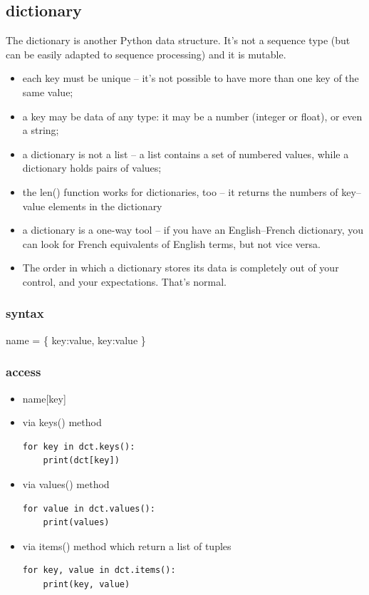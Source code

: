\documentclass[11pt]{article}
\begin{document}
\subsection{dictionary}
\label{sec:orgd43ad41}
The dictionary is another Python data structure. It’s not a sequence
type (but can be easily adapted to sequence processing) and it is
mutable.
\begin{itemize}
\item each key must be unique – it’s not possible to have more than one
key of the same value;
\item a key may be data of any type: it may be a number (integer or
float), or even a string;
\item a dictionary is not a list – a list contains a set of numbered
values, while a dictionary holds pairs of values;
\item the len() function works for dictionaries, too – it returns the
numbers of key–value elements in the dictionary
\item a dictionary is a one-way tool – if you have an English–French
dictionary, you can look for French equivalents of English terms,
but not vice versa.
\item The order in which a dictionary stores its data is completely out of
your control, and your expectations. That’s normal.
\end{itemize}

\subsubsection{syntax}
\label{sec:org21f4638}
name = \{ key:value, key:value \}

\subsubsection{access}
\label{sec:org7cfc2c6}
\begin{itemize}
\item name[key]

\item via keys() method
\begin{verbatim}
for key in dct.keys():
    print(dct[key])
\end{verbatim}

\item via values() method
\begin{verbatim}
for value in dct.values():
    print(values)
\end{verbatim}

\item via items() method which return a list of tuples
\begin{verbatim}
for key, value in dct.items():
    print(key, value)
\end{verbatim}
\end{itemize}
\end{document}

